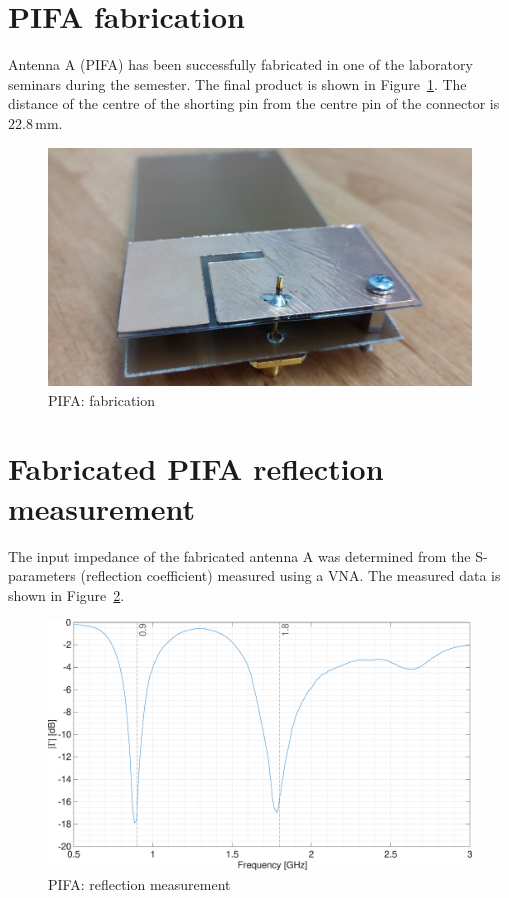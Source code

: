 \documentclass[11pt,a4paper]{article}
\begin{document}
\newpage
    \section{PIFA fabrication}
        Antenna A (PIFA) has been successfully fabricated in one of the laboratory seminars during the semester. The final product is shown in Figure~\ref{fig:pifa-fabrication}. The distance of the centre of the shorting pin from the centre pin of the connector is $22.8\, \mathrm{mm}$.
        \begin{figure}[!ht]
            \centering
            \includegraphics[width=.8\textwidth]{src/pifa-fabrication.jpg}
            \caption{\label{fig:pifa-fabrication}PIFA: fabrication}
        \end{figure}

    \section{Fabricated PIFA reflection measurement}
        The input impedance of the fabricated antenna A was determined from the S-parameters (reflection coefficient) measured using a VNA. The measured data is shown in Figure~\ref{fig:pifa-meas-reflection-linear}.
        \begin{figure}[!ht]
            \centering
            \includegraphics[width=.8\textwidth]{src/pifa-meas-reflection-linear.eps}
            \caption{\label{fig:pifa-meas-reflection-linear}PIFA: reflection measurement}
        \end{figure}
\end{document}
